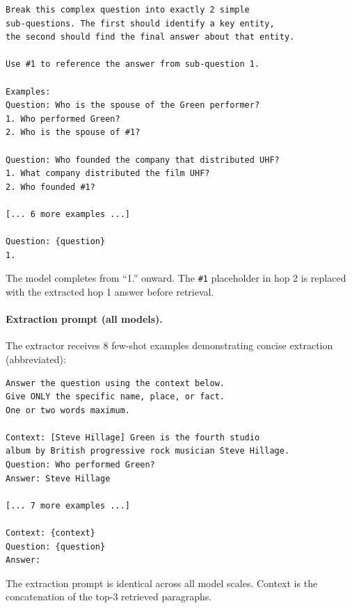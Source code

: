 \documentclass[11pt]{article}
\begin{document}
\begin{small}
\begin{verbatim}
Break this complex question into exactly 2 simple
sub-questions. The first should identify a key entity,
the second should find the final answer about that entity.

Use #1 to reference the answer from sub-question 1.

Examples:
Question: Who is the spouse of the Green performer?
1. Who performed Green?
2. Who is the spouse of #1?

Question: Who founded the company that distributed UHF?
1. What company distributed the film UHF?
2. Who founded #1?

[... 6 more examples ...]

Question: {question}
1.
\end{verbatim}
\end{small}

The model completes from ``1.'' onward. The \texttt{\#1} placeholder in hop 2 is replaced with the extracted hop 1 answer before retrieval.

\paragraph{Extraction prompt (all models).} The extractor receives 8 few-shot examples demonstrating concise extraction (abbreviated):

\begin{small}
\begin{verbatim}
Answer the question using the context below.
Give ONLY the specific name, place, or fact.
One or two words maximum.

Context: [Steve Hillage] Green is the fourth studio
album by British progressive rock musician Steve Hillage.
Question: Who performed Green?
Answer: Steve Hillage

[... 7 more examples ...]

Context: {context}
Question: {question}
Answer:
\end{verbatim}
\end{small}

The extraction prompt is identical across all model scales. Context is the concatenation of the top-3 retrieved paragraphs.
\end{document}
